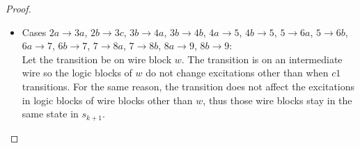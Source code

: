 \documentclass[12pt]{report}
\begin{document}
\begin{proof}
\begin{itemize}
\item
Cases $2a\rightarrow 3a$, $2b\rightarrow 3c$, $3b\rightarrow 4a$, $3b\rightarrow 4b$, $4a\rightarrow 5$, $4b\rightarrow 5$, $5\rightarrow 6a$, $5\rightarrow 6b$, $6a\rightarrow 7$, $6b\rightarrow 7$, $7\rightarrow 8a$, $7\rightarrow 8b$, $8a\rightarrow 9$, $8b\rightarrow 9$: \\ 
Let the transition be on wire block $w$.  The transition is on an intermediate wire so the logic blocks of $w$ do not change excitations other than when $c1$ transitions.  
For the same reason, the transition does not affect the excitations in logic blocks of wire blocks other than $w$, thus those wire blocks stay in the same state in $s_{k+1}$.  

\end{itemize}
\end{proof}
\end{document}

